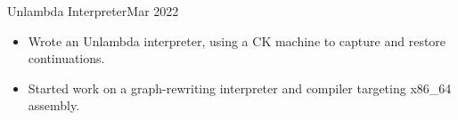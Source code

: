 \documentclass[a4paper,10pt]{article}
\begin{document}

    \begin{activity}{Unlambda Interpreter}{Mar 2022}
      \begin{itemize}[topsep=4pt, partopsep=0pt, itemsep=-2pt]
        \item Wrote an Unlambda interpreter, using a CK machine to capture and restore continuations.
        \item Started work on a graph-rewriting interpreter and compiler targeting x86\_64 assembly.
      \end{itemize}
    \end{activity}

\end{document}
